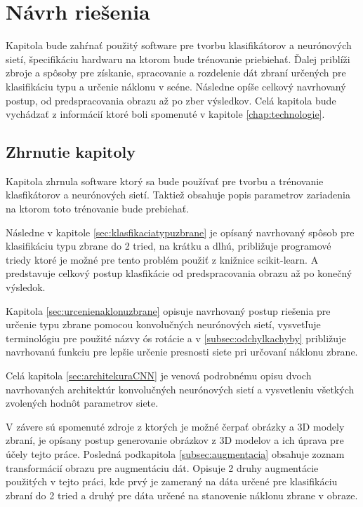 \chapter{Návrh riešenia}
Kapitola bude zahŕnať použitý software pre tvorbu klasifikátorov a neurónových sietí, špecifikáciu hardwaru na ktorom bude trénovanie priebiehať.
Ďalej priblíži zbroje a spôsoby pre získanie, spracovanie a rozdelenie dát zbraní určených pre klasifikáciu typu a určenie náklonu v scéne.
Následne opíše celkový navrhovaný postup, od predspracovania obrazu až po zber výsledkov.
Celá kapitola bude vychádzať z informácií ktoré boli spomenuté v kapitole \ref{chap:technologie}.













\section{Zhrnutie kapitoly}

Kapitola zhrnula software ktorý sa bude používať pre tvorbu a trénovanie klasfikátorov a neurónových sietí.
Taktiež obsahuje popis parametrov zariadenia na ktorom toto trénovanie bude prebiehať.

Následne v kapitole \ref{sec:klasfikaciatypuzbrane} je opísaný navrhovaný spôsob pre klasifikáciu typu zbrane do 2 tried, na krátku a dlhú, približuje
    programové triedy ktoré je možné pre tento problém použiť z knižnice scikit-learn.
A predstavuje celkový postup klasfikácie od predspracovania obrazu až po konečný výsledok.

Kapitola \ref{sec:urcenienaklonuzbrane} opisuje navrhovaný postup riešenia pre určenie typu zbrane pomocou konvolučných neurónových sietí,
    vysvetľuje terminológiu pre použité názvy ós rotácie a v \ref{subsec:odchylkachyby} približuje navrhovanú funkciu pre lepšie určenie presnosti siete
    pri určovaní náklonu zbrane.

Celá kapitola \ref{sec:architekuraCNN} je venová podrobnému opisu dvoch navrhovaných architektúr konvolučných neurónových sietí a
    vysvetleniu všetkých zvolených hodnôt parametrov siete.

V závere sú spomenuté zdroje z ktorých je možné čerpať obrázky a 3D modely zbraní, je opísany postup generovanie obrázkov z 3D modelov a ich úprava
    pre účely tejto práce.
Posledná podkapitola \ref{subsec:augmentacia} obsahuje zoznam transformácií obrazu pre augmentáciu dát.
Opisuje 2 druhy augmentácie použitých v tejto práci, kde prvý je zameraný na dáta určené pre klasifikáciu zbraní do 2 tried a druhý pre dáta
    určené na stanovenie náklonu zbrane v obraze.
